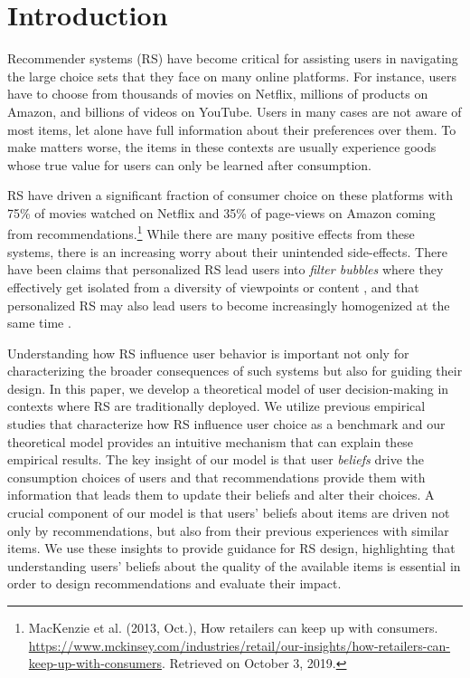 \documentclass[manuscript]{acmart}
\title[Deconstructing the Filter Bubble]{\PaperTitle}
\author{Guy Aridor}
\affiliation{%
  \institution{Columbia University}
  \city{New York}
  \state{NY}
  \country{USA}
}
\author{Duarte Gon\c{c}alves}
\affiliation{%
  \institution{Columbia University}
  \city{New York}
  \state{NY}
    \country{USA}
}
\author{Shan Sikdar}
\affiliation{%
  \institution{Everquote}
  \city{Cambridge}
  \state{MA}
    \country{USA}
}
\begin{document}
\maketitle


\section{Introduction}

Recommender systems (RS) have become critical for assisting users in navigating the large choice sets that they face on many online platforms. For instance, users have to choose from thousands of movies on Netflix, millions of products on Amazon, and billions of videos on YouTube. Users in many cases are not aware of most items, let alone have full information about their preferences over them. To make matters worse, the items in these contexts are usually experience goods whose true value for users can only be learned after consumption.
\par

RS have driven a significant fraction of consumer choice on these platforms with 75\% of movies watched on Netflix and 35\% of page-views on Amazon coming from recommendations.\footnote{MacKenzie et al. (2013, Oct.),  How retailers can keep up with consumers. \url{https://www.mckinsey.com/industries/retail/our-insights/how-retailers-can-keep-up-with-consumers}. Retrieved on October 3, 2019.} While there are many positive effects from these systems, there is an increasing worry about their unintended side-effects. There have been claims that personalized RS lead users into \textit{filter bubbles} where they effectively get isolated from a diversity of viewpoints or content \cite{pariser2011filter}, and that personalized RS may also lead users to become increasingly homogenized at the same time \cite{chaney2018algorithmic, hosanagar2013will}.
\par
Understanding how RS influence user behavior is important not only for characterizing the broader consequences of such systems but also for guiding their design. In this paper, we develop a theoretical model of user decision-making in contexts where RS are traditionally deployed. We utilize previous empirical studies that characterize how RS influence user choice as a benchmark and our theoretical model provides an intuitive mechanism that can explain these empirical results. The key insight of our model is that user \textit{beliefs} drive the consumption choices of users and that recommendations provide them with information that leads them to update their beliefs and alter their choices. A crucial component of our model is that users' beliefs about items are driven not only by recommendations, but also from their previous experiences with similar items. We use these insights to provide guidance for RS design, highlighting that understanding users' beliefs about the quality of the available items is essential in order to design recommendations and evaluate their impact.
\end{document}

